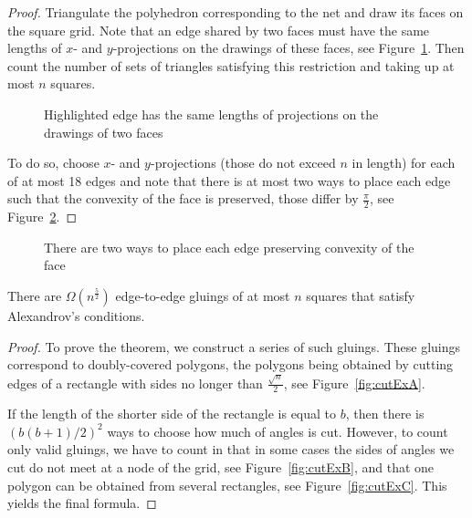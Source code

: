 \documentclass[a4paper,USenglish,cleveref, autoref, thm-restate]{socg-lipics-v2019}
\begin{document}
\begin{proof} Triangulate the polyhedron corresponding to the net and draw its faces on the square grid. Note that an edge shared by two faces must have the same lengths of $x$- and $y$-projections on the drawings of these faces, see Figure~\ref{fig:edgesMeeting}. Then count the number of sets of triangles satisfying this restriction and taking up at most $n$ squares.

\begin{figure}[h] \centering
{}\hspace{1.2cm}
\caption{Highlighted edge has the same lengths of projections on the drawings of two faces}
\label{fig:edgesMeeting}
\end{figure}

To do so, choose $x$- and $y$-projections (those do not exceed $n$ in length) for each of at most 18 edges and note that there is at most two ways to place each edge such that the convexity of the face is preserved, those differ by $\frac{\pi}{2}$, see Figure~\ref{fig:twoWays}. \end{proof}

\begin{figure}[h] \centering
{}
\caption{There are two ways to place each edge preserving convexity of the face}
\label{fig:twoWays}
\end{figure}

\begin{theorem} \label{thm:n52}
	There are $\Omega \left( n^{\frac52} \right)$ edge-to-edge gluings of at most $n$ squares that satisfy Alexandrov's conditions.
\end{theorem}

\begin{proof} To prove the theorem, we construct a series of such gluings. These gluings correspond to doubly-covered polygons, the polygons being obtained by cutting edges of a rectangle with sides no longer than $\frac{\sqrt{n}}{2}$, see Figure~\ref{fig:cutExA}.



If the length of the shorter side of the rectangle is equal to $b$, then there is $\left( b(b+1) / 2 \right)^2$ ways to choose how much of angles is cut. However, to count only valid gluings, we have to count in that in some cases the sides of angles we cut do not meet at a node of the grid, see Figure~\ref{fig:cutExB}, and that one polygon can be obtained from several rectangles, see Figure~\ref{fig:cutExC}. This yields the final formula.\end{proof}
\end{document}
